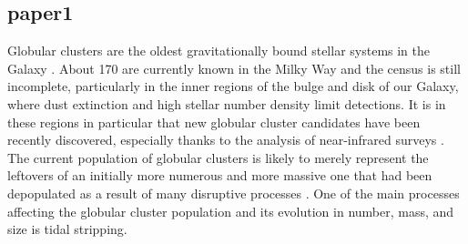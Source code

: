   \subsection{paper1}
Globular clusters are the oldest gravitationally bound stellar systems in the Galaxy \citep{1997A&ARv...8....1M}. About 170 are currently known in the Milky Way \citep{2021MNRAS.505.5978V} and the census is still incomplete, particularly in the inner regions of the bulge and disk of our Galaxy, where  dust extinction and  high stellar number density limit detections. It is in these regions in particular that new globular cluster candidates have been recently discovered, especially thanks to the analysis of near-infrared surveys  
\citep{2011A&A...527A..81M,2011A&A...535A..33M,2017ApJ...838L..14M,2017ApJ...849L..24M,2018ApJ...866...12M,2019A&A...628A..45G,2020A&A...642L..19G,2022A&A...659A.155G,2022A&A...658A.120G,2021A&A...649A..86G,2021A&A...650L..11M,2021A&A...652A.129M,2022MNRAS.509.4962G}.  The current population of globular clusters  is likely to merely represent the leftovers of an initially more numerous and more massive one that had been depopulated as a result of many disruptive processes \citep{1997ApJ...474..223G, 1997MNRAS.288..749M, 1997MNRAS.291..717M, 1997MNRAS.289..898V, fall01}. One of the main processes affecting the globular cluster population and its evolution in number, mass, and size is tidal stripping.   

